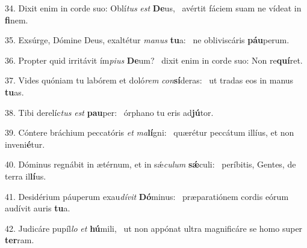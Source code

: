 34. Dixit enim in corde suo: Oblí\textit{tus} \textit{est} \textbf{De}us, \ast\  avértit fáciem suam ne vídeat in \textbf{fi}nem.\

35. Exsúrge, Dómine Deus, exaltétur \textit{ma}\textit{nus} \textbf{tu}a: \ast\  ne obliviscáris \textbf{páu}perum.\

36. Propter quid irritávit ím\textit{pi}\textit{us} \textbf{De}um? \ast\  dixit enim in corde suo: Non re\textbf{quí}ret.\

37. Vides quóniam tu labórem et doló\textit{rem} \textit{con}\textbf{sí}deras: \ast\  ut tradas eos in manus \textbf{tu}as.\

38. Tibi derelíc\textit{tus} \textit{est} \textbf{pau}per: \ast\  órphano tu eris ad\textbf{jú}tor.\

39. Cóntere bráchium peccatóris \textit{et} \textit{ma}\textbf{lí}gni: \ast\  quærétur peccátum illíus, et non inveni\textbf{é}tur.\

40. Dóminus regnábit in ætérnum, et in sǽ\textit{cu}\textit{lum} \textbf{sǽ}culi: \ast\  períbitis, Gentes, de terra il\textbf{lí}us.\

41. Desidérium páuperum exau\textit{dí}\textit{vit} \textbf{Dó}minus: \ast\  præparatiónem cordis eórum audívit auris \textbf{tu}a.\

42. Judicáre pupíl\textit{lo} \textit{et} \textbf{hú}mili, \ast\  ut non appónat ultra magnificáre se homo super \textbf{ter}ram.\

